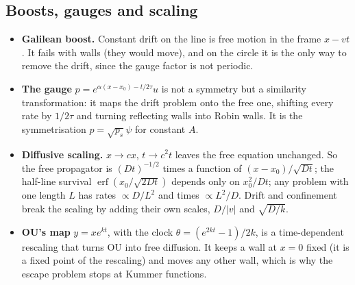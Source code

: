 \documentclass[11pt]{article}
\begin{document}
\subsection{Boosts, gauges and scaling}
\begin{itemize}
  \item \textbf{Galilean boost.} Constant drift on the line is free motion in the frame $x-vt$. It fails with walls (they
        would move), and on the circle it is the only way to remove the drift, since the gauge factor is not periodic.
  \item \textbf{The gauge} $p=e^{\alpha(x-x_0)-t/2\tau}u$ is not a symmetry but a similarity transformation: it maps the
        drift problem onto the free one, shifting every rate by $1/2\tau$ and turning reflecting walls into Robin walls. It is
        the symmetrisation $p=\sqrt{p_s}\psi$ for constant $A$.
  \item \textbf{Diffusive scaling.} $x\to cx$, $t\to c^2t$ leaves the free equation unchanged. So the free propagator is
        $(Dt)^{-1/2}$ times a function of $(x-x_0)/\sqrt{Dt}$; the half-line survival $\operatorname{erf}(x_0/\sqrt{2Dt})$ depends
        only on $x_0^2/Dt$; any problem with one length $L$ has rates $\propto D/L^2$ and times $\propto L^2/D$. Drift and
        confinement break the scaling by adding their own scales, $D/|v|$ and $\sqrt{D/k}$.
  \item \textbf{OU's map} $y=xe^{kt}$, with the clock $\theta=(e^{2kt}-1)/2k$, is a time-dependent rescaling that turns OU
        into free diffusion. It keeps a wall at $x=0$ fixed (it is a fixed point of the rescaling) and moves any other wall,
        which is why the escape problem stops at Kummer functions.
\end{itemize}
\end{document}
